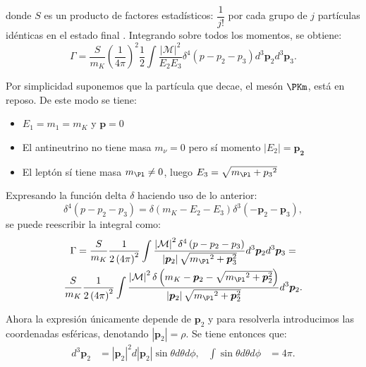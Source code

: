 donde $S$ es un producto de factores estadísticos: $\dfrac{1}{j!}$ por cada grupo de $j$ partículas idénticas en el estado final \cite{Griffiths2008}. Integrando sobre todos los momentos, se obtiene:
\begin{equation}
\Gamma =\dfrac{S}{m_{K}}\left( \dfrac{1}{4\pi }\right) ^{2}\dfrac{1}{2}\int \dfrac{\left| \mathcal{M}\right| ^{2}}{E_{2}E_{3}}\delta ^{4}\left( p-p_{2}-p_{3}\right) d^{3}\boldsymbol{p}_{2}d^{3}\boldsymbol{p}_{3} .
\end{equation}

Por simplicidad suponemos que la partícula que decae, el mesón $\PKm$, está en reposo. De este modo se tiene:
\begin{itemize}
\item $E_1=m_1=m_K$ y $\boldsymbol{p}=0$
\item El antineutrino no tiene masa $m_{\nu}=0$ pero sí momento $|E_2|=\boldsymbol{p_2}$
\item El leptón sí tiene masa $m_{\Pl} \neq 0$, luego $E_3=\sqrt{m_{\Pl}+{p_{3}}^2}$
\end{itemize}

Expresando la función delta $\delta$ haciendo uso de lo anterior:
\begin{equation}
\delta ^{4}\left( p-p_{2}-p_{3}\right) =\delta \left( m_{K}-E_{2}-E_{3}\right) \delta ^{3}\left( -\boldsymbol{p}_{2}-\boldsymbol{p}_{3}\right) ,
\end{equation}
se puede reescribir la integral como:
\begin{multline}
\Gamma =\dfrac{S}{m_{K}}\dfrac{1}{2\left( 4\pi \right) ^{2}}\int \dfrac{\left|\mathcal{M}\right| ^{2}\delta ^{4}\left( p-p_{2}-p_{3}\right) }{\left| \boldsymbol{p}_{2}\right| \sqrt{{m_{\Pl}}^{2}+\boldsymbol{p}_{3} ^{2}}} d^{3}\boldsymbol{p}_{2} d^{3}\boldsymbol{p}_{3} = \\ \dfrac{S}{m_{K}}\dfrac{1}{2\left( 4\pi \right) ^{2}}\int \dfrac{\left|\mathcal{M}\right| ^{2}\delta\left(m_{K}-\boldsymbol{p}_{2}-\sqrt{{m_{\Pl}}^{2}+\boldsymbol{p}_{2} ^{2}}\right)}{ \left| \boldsymbol{p}_{2}\right| \sqrt{{m_{\Pl}}^{2}+\boldsymbol{p}_{2} ^{2}}} d^{3}\boldsymbol{p}_{2} .
\end{multline}

Ahora la expresión únicamente depende de $\boldsymbol{p}_{2}$ y para resolverla introducimos las coordenadas esféricas, denotando $\left| \boldsymbol{p}_{2}\right|=\rho$. Se tiene entonces que:
\begin{align}
d^{3}\boldsymbol{p}_{2} &= \left| \boldsymbol{p}_{2}\right| ^{2}d\left|\boldsymbol{p}_{2}\right| \sin \theta d\theta d\phi , & \int \sin \theta d\theta d\phi &= 4\pi .
\end{align}

